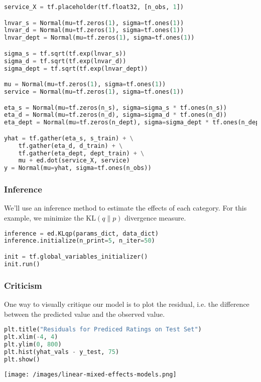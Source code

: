\begin{lstlisting}[language=Python]
service_X = tf.placeholder(tf.float32, [n_obs, 1])

lnvar_s = Normal(mu=tf.zeros(1), sigma=tf.ones(1))
lnvar_d = Normal(mu=tf.zeros(1), sigma=tf.ones(1))
lnvar_dept = Normal(mu=tf.zeros(1), sigma=tf.ones(1))

sigma_s = tf.sqrt(tf.exp(lnvar_s))
sigma_d = tf.sqrt(tf.exp(lnvar_d))
sigma_dept = tf.sqrt(tf.exp(lnvar_dept))

mu = Normal(mu=tf.zeros(1), sigma=tf.ones(1))
service = Normal(mu=tf.zeros(1), sigma=tf.ones(1))

eta_s = Normal(mu=tf.zeros(n_s), sigma=sigma_s * tf.ones(n_s))
eta_d = Normal(mu=tf.zeros(n_d), sigma=sigma_d * tf.ones(n_d))
eta_dept = Normal(mu=tf.zeros(n_dept), sigma=sigma_dept * tf.ones(n_dept))

yhat = tf.gather(eta_s, s_train) + \
    tf.gather(eta_d, d_train) + \
    tf.gather(eta_dept, dept_train) + \
    mu + ed.dot(service_X, service)
y = Normal(mu=yhat, sigma=tf.ones(n_obs))
\end{lstlisting}

\subsubsection{Inference}

We'll use an inference method to estimate the effects of each category. For this example, we minimize the $\text{KL}(q\|p)$ divergence measure.

\begin{lstlisting}[language=Python]
inference = ed.KLqp(params_dict, data_dict)
inference.initialize(n_print=5, n_iter=50)

init = tf.global_variables_initializer()
init.run()
\end{lstlisting}

\subsubsection{Criticism}

One way to visually critique our model is to plot the residual, i.e. the difference between the predicted value and the observed value.

\begin{lstlisting}[language=Python]
plt.title("Residuals for Prediced Ratings on Test Set")
plt.xlim(-4, 4)
plt.ylim(0, 800)
plt.hist(yhat_vals - y_test, 75)
plt.show()
\end{lstlisting}

\texttt{[image: /images/linear-mixed-effects-models.png]}


